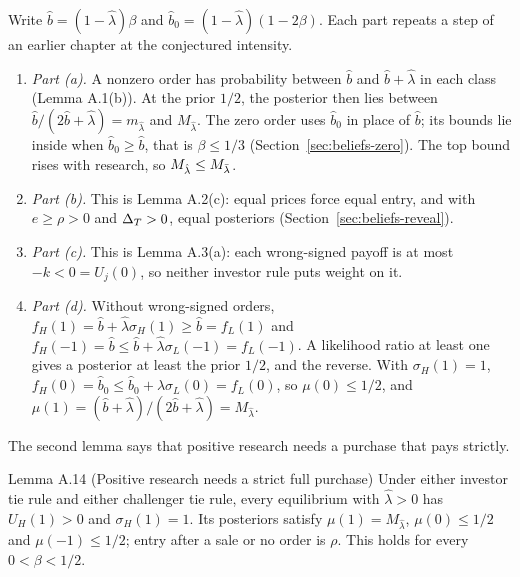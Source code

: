 Write \(\hat b=(1-\hat\lambda)\beta\) and \(\hat b_0=(1-\hat\lambda)(1-2\beta)\). Each part repeats a step of an earlier
chapter at the conjectured intensity.
\begin{enumerate}
\item \emph{Part (a).} A nonzero order has probability between \(\hat b\) and \(\hat b+\hat\lambda\) in each class
(Lemma A.1(b)). At the prior \(1/2\), the posterior then lies between \(\hat b/(2\hat b+\hat\lambda)=m_{\hat\lambda}\)
and \(M_{\hat\lambda}\). The zero order uses \(\hat b_0\) in place of \(\hat b\); its bounds lie inside when
\(\hat b_0\ge\hat b\), that is \(\beta\le1/3\) (Section~\ref{sec:beliefs-zero}). The top bound rises with research, so
\(M_{\hat\lambda}\le M_{\bar\lambda}\).
\item \emph{Part (b).} This is Lemma A.2(c): equal prices force equal entry, and with \(e\ge\rho>0\) and \(\Delta_T>0\),
equal posteriors (Section~\ref{sec:beliefs-reveal}).
\item \emph{Part (c).} This is Lemma A.3(a): each wrong-signed payoff is at most \(-k<0=U_j(0)\), so neither investor
rule puts weight on it.
\item \emph{Part (d).} Without wrong-signed orders, \(f_H(1)=\hat b+\hat\lambda\sigma_H(1)\ge\hat b=f_L(1)\) and
\(f_H(-1)=\hat b\le\hat b+\hat\lambda\sigma_L(-1)=f_L(-1)\). A likelihood ratio at least one gives a posterior at least
the prior \(1/2\), and the reverse. With \(\sigma_H(1)=1\), \(f_H(0)=\hat b_0\le\hat b_0+\hat\lambda\sigma_L(0)=f_L(0)\),
so \(\mu(0)\le1/2\), and \(\mu(1)=(\hat b+\hat\lambda)/(2\hat b+\hat\lambda)=M_{\hat\lambda}\).
\end{enumerate}

The second lemma says that positive research needs a purchase that pays strictly.

\begin{paperresult}{Lemma A.14 (Positive research needs a strict full purchase)}
Under either investor tie rule and either challenger tie rule, every equilibrium with \(\hat\lambda>0\) has
\(U_H(1)>0\) and \(\sigma_H(1)=1\). Its posteriors satisfy \(\mu(1)=M_{\hat\lambda}\), \(\mu(0)\le1/2\) and
\(\mu(-1)\le1/2\); entry after a sale or no order is \(\rho\). This holds for every \(0<\beta<1/2\).
\end{paperresult}

